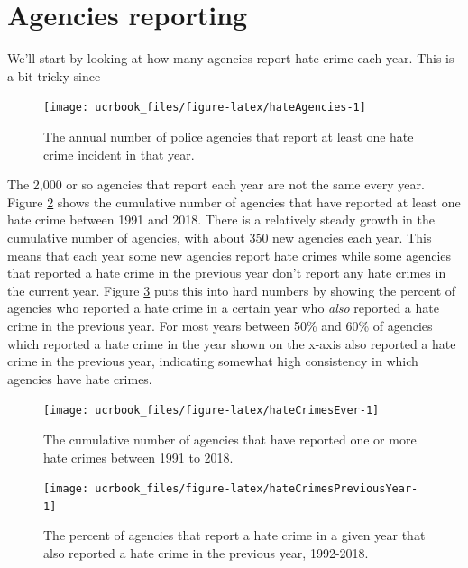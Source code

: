 \documentclass[
  12pt,
  openany]{book}
\begin{document}
\hypertarget{agencies-reporting-6}{%
\section{Agencies reporting}\label{agencies-reporting-6}}

We'll start by looking at how many agencies report hate crime each year. This is a bit tricky since

\begin{figure}

{\centering \texttt{[image: ucrbook\_files/figure-latex/hateAgencies-1]} 

}

\caption{The annual number of police agencies that report at least one hate crime incident in that year.}\label{fig:hateAgencies}
\end{figure}

The 2,000 or so agencies that report each year are not the same every year. Figure \ref{fig:hateCrimesEver} shows the cumulative number of agencies that have reported at least one hate crime between 1991 and 2018. There is a relatively steady growth in the cumulative number of agencies, with about 350 new agencies each year. This means that each year some new agencies report hate crimes while some agencies that reported a hate crime in the previous year don't report any hate crimes in the current year. Figure \ref{fig:hateCrimesPreviousYear} puts this into hard numbers by showing the percent of agencies who reported a hate crime in a certain year who \emph{also} reported a hate crime in the previous year. For most years between 50\% and 60\% of agencies which reported a hate crime in the year shown on the x-axis also reported a hate crime in the previous year, indicating somewhat high consistency in which agencies have hate crimes.

\begin{figure}

{\centering \texttt{[image: ucrbook\_files/figure-latex/hateCrimesEver-1]} 

}

\caption{The cumulative number of agencies that have reported one or more hate crimes between 1991 to 2018.}\label{fig:hateCrimesEver}
\end{figure}

\begin{figure}

{\centering \texttt{[image: ucrbook\_files/figure-latex/hateCrimesPreviousYear-1]} 

}

\caption{The percent of agencies that report a hate crime in a given year that also reported a hate crime in the previous year, 1992-2018.}\label{fig:hateCrimesPreviousYear}
\end{figure}
\end{document}
